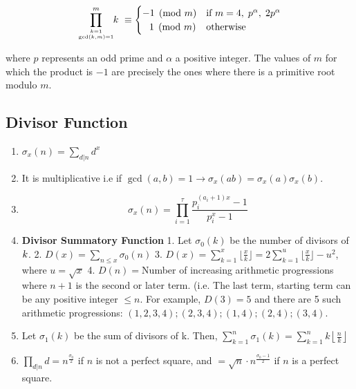 \begin{enumerate}
     $$\displaystyle \displaystyle \prod \limits_{k=1 \atop \gcd(k,m)=1}^{m}\!\!k\ \equiv {\begin{cases}-1{\pmod {m}}&{\text{if }}m=4,\;p^{\alpha },\;2p^{\alpha }\\\;\;\,1{\pmod {m}}&{\text{otherwise}}\end{cases}}$$

     where $\displaystyle p$ represents an odd prime and $\displaystyle \alpha$  a positive integer. The values of $m$ for which the product is $-1$ are precisely the ones where there is a primitive root modulo $m$.
\end{enumerate}

\subsection{Divisor Function}
\begin{enumerate}
\item $\displaystyle \sigma_x(n)=\sum\limits_{d\vert n}^{}d^x$
\item It is multiplicative i.e if $\displaystyle \gcd(a, b)=1\to \sigma_x(ab)=\sigma_x(a)\sigma_x(b)$.
\item $$\displaystyle \sigma_x(n)=\prod\limits_{i=1}^{\tau}\frac{p_i^{(a_i+1)x}-1}{p_i^x-1}$$
\item \textbf{Divisor Summatory Function}
     1. Let $\displaystyle \sigma_0(k)$ be the number of divisors of $\displaystyle \displaystyle k$.
     2. $D(x)=\sum\limits_{n\leq{x}}{\sigma_0(n)}$
     3. $D(x)=\sum\limits_{k=1}^{x}\lfloor\frac{x}{k}\rfloor=2\sum\limits_{k=1}^{u}\lfloor\frac{x}{k}\rfloor-u^2$, where $u=\sqrt{x}$
     4. $D(n)=$Number of increasing arithmetic progressions where $n+1$ is the second or later term. (i.e. The last term, starting term can be any positive integer $\displaystyle \le n$. For example, $D(3)=5$ and there are 5 such arithmetic progressions: $\displaystyle (1, 2, 3, 4); (2, 3, 4); (1, 4); (2, 4); (3, 4).$
\item Let $\displaystyle \sigma_1(k)$ be the sum of divisors of k. Then, $\displaystyle \sum\limits_{k=1}^{n}\sigma_1(k)=\sum\limits_{k=1}^{n}{k \left\lfloor \frac{n}{k} \right\rfloor}$
\item $\displaystyle \prod\limits_{d\vert n}^{}d={n^{\frac{\sigma_0}{2}}}$ if $n$ is not a perfect square, and $=\sqrt{n} \cdot n^{\frac{\sigma_0-1}{2}}$ if $n $ is a perfect square.
\end{enumerate}

